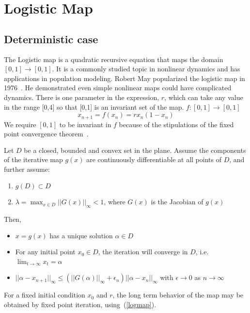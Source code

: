 \section{Logistic Map}
\subsection{Deterministic case}
\hspace{5mm}The Logistic map is a quadratic recursive equation that maps the domain
$[0,1] \rightarrow [0,1]$. It is a commonly studied topic in nonlinear dynamics and has
applications in population modeling. Robert May popularized the
logistic map in 1976~\cite{may}. He demonstrated even simple nonlinear
maps could have complicated dynamics. There is one parameter in the
expression, $r$, which can take any value in the range [0,4] so that
[0,1] is an invariant set of the map. $f:[0,1]\to [0,1]$
\begin{equation}\label{logmap}
x_{n+1} = f(x_n) = rx_n(1-x_n)
\end{equation}
We require $[0,1]$ to be invariant in $f$ because of the stipulations
of the fixed point convergence theorem~\cite{atkinson}.
\begin{singlespace}
\begin{theorem}\label{thm:fp}
Let $D$ be a closed, bounded and convex set in the plane. Assume the
components of the iterative map $g(x)$ are continuously differentiable at all points of
$D$, and further assume: 
\begin{enumerate}
\item $g(D) \subset D$
\item $\lambda =\max_{x\in D}||G(x)||_\infty < 1$, where $G(x)$ is the Jacobian of
$g(x)$
\end{enumerate}
Then, 
\begin{itemize}
\item $x=g(x)$ has a unique solution $\alpha \in D$
\item For any initial point $x_0 \in D$, the iteration will converge
  in $D$, i.e. $\lim_{t \to \infty}x_t = \alpha$
\item $||\alpha - x_{n+1}||_\infty \leq
  (||G(\alpha)||_\infty+\epsilon_n)||\alpha - x_n||_\infty$ with
  $\epsilon \to 0$ as $n\to \infty$
\end{itemize}
\end{theorem}
\end{singlespace}
 For a fixed initial condition $x_0$ and $r$, the long term behavior of
the map may be obtained by fixed point iteration, using~(\ref{logmap}). 
